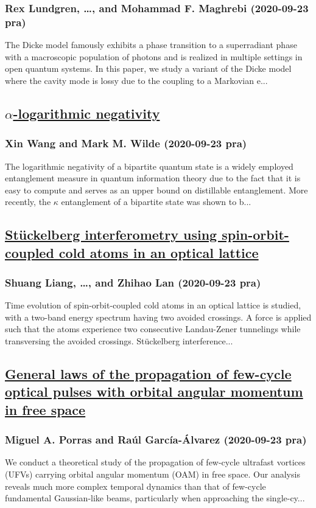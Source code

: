 \subsubsection*{Rex Lundgren, \dots, and Mohammad F. Maghrebi (2020-09-23 pra)}
The Dicke model famously exhibits a phase transition to a superradiant phase with a macroscopic population of photons and is realized in multiple settings in open quantum systems. In this paper, we study a variant of the Dicke model where the cavity mode is lossy due to the coupling to a Markovian e...
\subsection*{\href{http://link.aps.org/doi/10.1103/PhysRevA.102.032416}{$α$-logarithmic negativity}}
\subsubsection*{Xin Wang and Mark M. Wilde (2020-09-23 pra)}
The logarithmic negativity of a bipartite quantum state is a widely employed entanglement measure in quantum information theory due to the fact that it is easy to compute and serves as an upper bound on distillable entanglement. More recently, the $κ$ entanglement of a bipartite state was shown to b...
\subsection*{\href{http://link.aps.org/doi/10.1103/PhysRevA.102.033332}{Stückelberg interferometry using spin-orbit-coupled cold atoms in an optical lattice}}
\subsubsection*{Shuang Liang, \dots, and Zhihao Lan (2020-09-23 pra)}
Time evolution of spin-orbit-coupled cold atoms in an optical lattice is studied, with a two-band energy spectrum having two avoided crossings. A force is applied such that the atoms experience two consecutive Landau-Zener tunnelings while transversing the avoided crossings. Stückelberg interference...
\subsection*{\href{http://link.aps.org/doi/10.1103/PhysRevA.102.033522}{General laws of the propagation of few-cycle optical pulses with orbital angular momentum in free space}}
\subsubsection*{Miguel A. Porras and Raúl García-Álvarez (2020-09-23 pra)}
We conduct a theoretical study of the propagation of few-cycle ultrafast vortices (UFVs) carrying orbital angular momentum (OAM) in free space. Our analysis reveals much more complex temporal dynamics than that of few-cycle fundamental Gaussian-like beams, particularly when approaching the single-cy...
